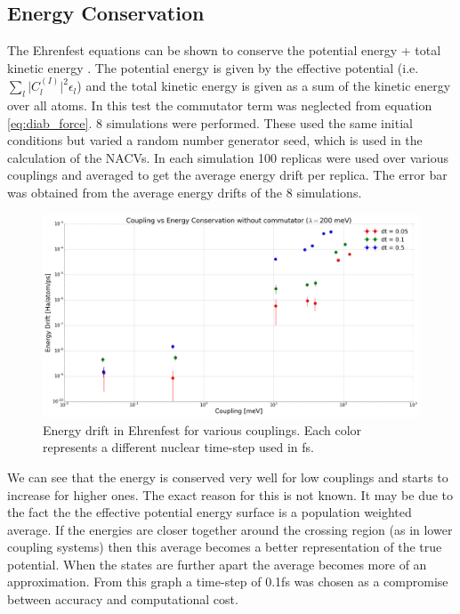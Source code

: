 \subsection{Energy Conservation}
The Ehrenfest equations can be shown to conserve the potential energy + total kinetic energy \cite{john_c._tully_nonadiabatic_1998}. The potential energy is given by the effective potential (i.e. $\sum_{l} \vert C_{l}^{(I)} \vert^2 \epsilon_{l}$) and the total kinetic energy is given as a sum of the kinetic energy over all atoms. In this test the commutator term was neglected from equation \eqref{eq:diab_force}. 8 simulations were performed. These used the same initial conditions but varied a random number generator seed, which is used in the calculation of the NACVs. In each simulation 100 replicas were used over various couplings and averaged to get the average energy drift per replica. The error bar was obtained from the average energy drifts of the 8 simulations.
\begin{figure}[H]
  \includegraphics[width=\textwidth]{./img/energy_conservation.png}
  \caption{\label{fig:Ehren_Ener_Cons}Energy drift in Ehrenfest for various couplings. Each color represents a different nuclear time-step used in fs.}
\end{figure}
We can see that the energy is conserved very well for low couplings and starts to increase for higher ones. The exact reason for this is not known. It may be due to the fact the the effective potential energy surface is a population weighted average. If the energies are closer together around the crossing region (as in lower coupling systems) then this average becomes a better representation of the true potential. When the states are further apart the average becomes more of an approximation. From this graph a time-step of 0.1fs was chosen as a compromise between accuracy and computational cost.
\\

